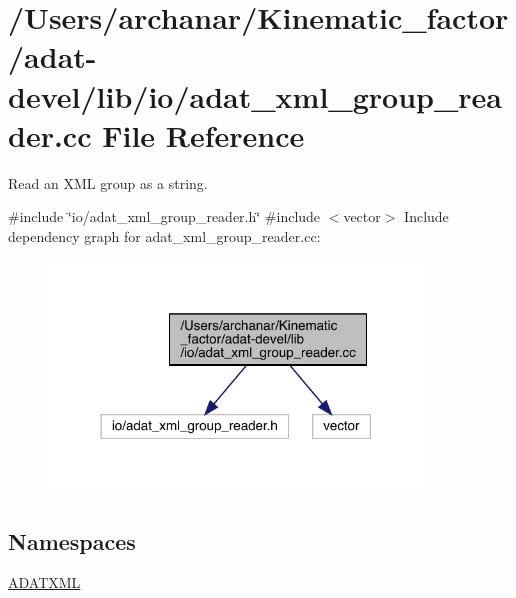 \hypertarget{adat-devel_2lib_2io_2adat__xml__group__reader_8cc}{}\section{/\+Users/archanar/\+Kinematic\+\_\+factor/adat-\/devel/lib/io/adat\+\_\+xml\+\_\+group\+\_\+reader.cc File Reference}
\label{adat-devel_2lib_2io_2adat__xml__group__reader_8cc}


Read an X\+ML group as a string.  


{\ttfamily \#include \char`\"{}io/adat\+\_\+xml\+\_\+group\+\_\+reader.\+h\char`\"{}}\newline
{\ttfamily \#include $<$vector$>$}\newline
Include dependency graph for adat\+\_\+xml\+\_\+group\+\_\+reader.\+cc\+:
\nopagebreak
\begin{figure}[H]
\begin{center}
\leavevmode
\includegraphics[width=282pt]{d0/da6/adat-devel_2lib_2io_2adat__xml__group__reader_8cc__incl}
\end{center}
\end{figure}
\subsection*{Namespaces}
\begin{DoxyCompactItemize}
\item 
 \mbox{\hyperlink{namespaceADATXML}{A\+D\+A\+T\+X\+ML}}
\end{DoxyCompactItemize}
